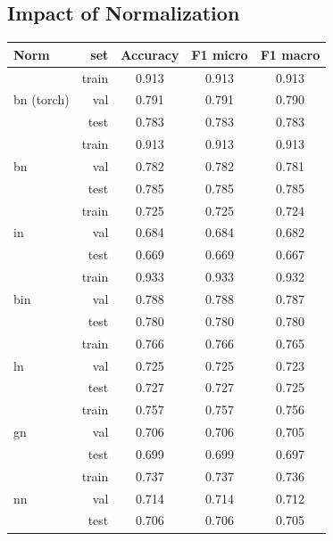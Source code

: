 \documentclass[12pt]{article}
\begin{document}
\subsection{Impact of Normalization}

\begin{center}
\begin{tabular}{|l|r|c|c|c|}
    \hline
    Norm & set & Accuracy & F1 micro & F1 macro \\
    \hline
    \multirow{3}{*}{bn (torch)}%
    & train & 0.913 & 0.913 & 0.913 \\
    & val & 0.791 & 0.791 & 0.790 \\
    & test & 0.783 & 0.783 & 0.783 \\
    \hline

    \hline
    \multirow{3}{*}{bn}%
    & train & 0.913 & 0.913 & 0.913 \\
    & val & 0.782 & 0.782 & 0.781 \\
    & test & 0.785 & 0.785 & 0.785 \\
    \hline

    \hline
    \multirow{3}{*}{in}%
    & train & 0.725 & 0.725 & 0.724 \\
    & val & 0.684 & 0.684 & 0.682 \\
    & test & 0.669 & 0.669 & 0.667 \\
    \hline

    \hline
    \multirow{3}{*}{bin}%
    & train & 0.933 & 0.933 & 0.932 \\
    & val & 0.788 & 0.788 & 0.787 \\
    & test & 0.780 & 0.780 & 0.780 \\
    \hline

    \hline
    \multirow{3}{*}{ln}%
    & train & 0.766 & 0.766 & 0.765 \\
    & val & 0.725 & 0.725 & 0.723 \\
    & test & 0.727 & 0.727 & 0.725 \\
    \hline

    \hline
    \multirow{3}{*}{gn}%
    & train & 0.757 & 0.757 & 0.756 \\
    & val & 0.706 & 0.706 & 0.705 \\
    & test & 0.699 & 0.699 & 0.697 \\
    \hline

    \hline
    \multirow{3}{*}{nn}%
    & train & 0.737 & 0.737 & 0.736 \\
    & val & 0.714 & 0.714 & 0.712 \\
    & test & 0.706 & 0.706 & 0.705 \\
    \hline
\end{tabular}

\end{center}
\end{document}
